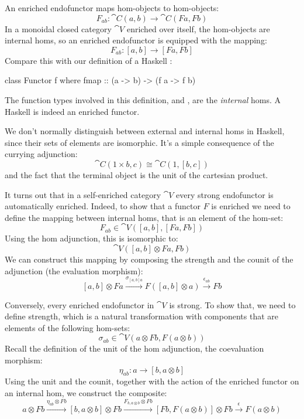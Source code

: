 \documentclass[DaoFP]{subfiles}
\begin{document}
An enriched endofunctor maps hom-objects to hom-objects:
\[ F_{a b} \colon \cat C (a, b) \to \cat C (F a, F b) \]
In a monoidal closed category $\cat V$ enriched over itself, the hom-objects are internal homs, so an enriched endofunctor is equipped with the mapping:
\[ F_{a b} \colon [a, b] \to [F a, F b] \]
Compare this with our definition of a Haskell :
\begin{haskell}
class Functor f where
  fmap :: (a -> b) -> (f a -> f b)
\end{haskell}
The function types involved in this definition,  and , are the \emph{internal} homs. A Haskell  is indeed an enriched functor. 

We don't normally distinguish between external and internal homs in Haskell, since their sets of elements are isomorphic. It's a simple consequence of the currying adjunction:
\[ \cat C(1 \times b, c) \cong \cat C(1, [b, c]) \]
and the fact that the terminal object is the unit of the cartesian product.

It turns out that in a self-enriched category $\cat V$ every strong endofunctor is automatically enriched. Indeed, to show that a functor $F$ is enriched we need to define the mapping between internal homs, that is an element of the hom-set:
\[ F_{a b} \in \cat V([a, b], [F a, F b]) \]
Using the hom adjunction, this is isomorphic to:
\[ \cat V([a, b] \otimes F a, F b) \]
We can construct this mapping by composing the strength and the counit of the adjunction (the evaluation morphism):
\[ [a, b] \otimes F a \xrightarrow{\sigma_{[a, b] a}} F ([a, b] \otimes a) \xrightarrow{\epsilon_{a b}} F b \]

Conversely, every enriched endofunctor in $\cat V$ is strong. To show that, we need to define strength, which is a natural transformation with components that are elements of the following hom-sets:
\[ \sigma_{a b} \in \cat V(a \otimes F b, F (a \otimes b)) \]
Recall the definition of the unit of the hom adjunction, the coevaluation morphism:
\[ \eta_{a b} \colon a \to [b, a \otimes b] \]
Using the unit and the counit, together with the action of the enriched functor on an internal hom, we construct the composite:
\[ a \otimes F b \xrightarrow{\eta_{a b} \otimes Fb} [b, a \otimes b] \otimes F b \xrightarrow{F_{b, a \otimes b} \otimes F b} [F b, F (a \otimes b)] \otimes F b \xrightarrow{\epsilon} F (a \otimes b)\]
\end{document}
